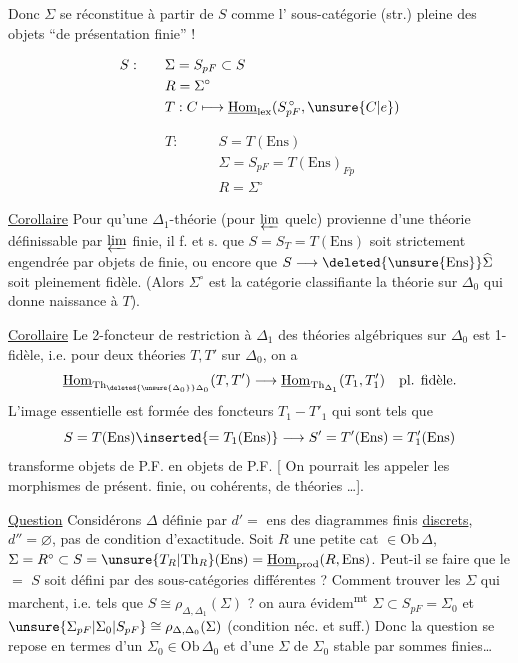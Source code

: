 Donc $\Sigma$ se réconstitue à partir de $S$ comme l' sous-catégorie (str.) pleine des objets ``de présentation finie'' !

\[
\begin{aligned}
S:\qquad&\Sigma=S_{pF}\subset S\\
&R=\Sigma^\circ\\
&T:C\longmapsto\underline{\mathrm{Hom}}_{\mathrm{lex}}(S_{pF}^{\,\circ},\unsure{C|e})
\end{aligned}
\]

\[
\begin{aligned}
T:\qquad&S=T(\mathrm{Ens})\\
&\Sigma=S_{pF}=T(\mathrm{Ens})_{Fp}\\
&R=\Sigma^\circ
\end{aligned}
\]

\uline{Corollaire} Pour qu'une  $\Delta_1$-théorie  (pour $\varprojlim$ quelc) provienne d'une théorie définissable par $\varprojlim$ finie, il f. et s. que $S=S_T=T(\mathrm{Ens})$ soit  strictement engendrée par   objets de  finie, ou encore que $S\longrightarrow\deleted{\unsure{\mathrm{Ens}}}\widehat{\Sigma}$ soit pleinement fidèle. (Alors $\Sigma^\circ$ est la catégorie classifiante  la théorie sur $\Delta_0$ qui donne naissance à $T$).

\uline{Corollaire} Le 2-foncteur de restriction à $\Delta_1$ des théories algébriques sur $\Delta_0$ est 1-fidèle, i.e. pour  deux théories $T,T'$ sur $\Delta_0$, on a
\[
\underline{\mathrm{Hom}}_{\mathrm{Th}_{\deleted{\unsure{\Delta_0}}\Delta_0}}(T,T')\longrightarrow\underline{\mathrm{Hom}}_{\mathrm{Th}_{\Delta_1}}(T_1,T'_1)\quad\text{pl. fidèle.}
\]
L'image essentielle est formée des foncteurs $T_1-T'_1$ qui sont tels que
\[
S=T(\mathrm{Ens})\inserted{=T_1(\mathrm{Ens})}\longrightarrow S'=T'(\mathrm{Ens})=T'_1(\mathrm{Ens})
\]
transforme objets de P.F. en objets de P.F. [ On pourrait les appeler les morphismes de présent. finie, ou cohérents, de théories \ldots ].

\uline{Question} Considérons $\Delta$ définie par $d'=$ ens des diagrammes finis \uline{discrets}, $d''=\varnothing$, pas de condition d'exactitude. Soit $R$ une petite cat $\in\mathrm{Ob}\,\Delta$, $\Sigma=R^\circ\subset S=\unsure{T_R|\mathrm{Th}_R}(\mathrm{Ens})=\underline{\mathrm{Hom}}_{\mathrm{prod}}(R,\mathrm{Ens})$. Peut-il se faire que le $=$ $S$ soit défini par des sous-catégories  différentes ?  Comment trouver  les $\Sigma$ qui marchent, i.e. tels que $S\cong\rho_{\Delta,\Delta_1}(\Sigma)$ ? on aura évidem\textsuperscript{mt} $\Sigma\subset S_{pF}=\Sigma_0$ et $\unsure{\Sigma_{pF}|\Sigma_0|S_{pF}}\cong\rho_{\Delta,\Delta_0}(\Sigma)$ (condition néc. et suff.) Donc la question se repose en termes d'un $\Sigma_0\in\mathrm{Ob}\,\Delta_0$ et d'une   $\Sigma$ de $\Sigma_0$ stable par sommes finies\ldots
